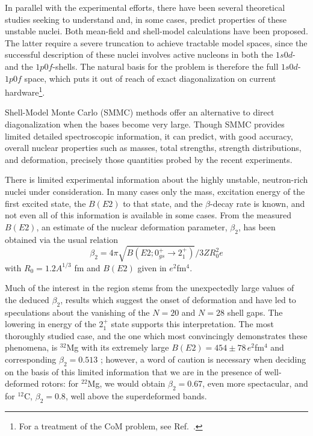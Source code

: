 \documentclass{article}
\begin{document}
In parallel with the experimental efforts, there have been several
theoretical studies seeking to understand and, in some cases, predict
properties of these unstable nuclei.  Both mean-field
\cite{r:werner,r:campi} and shell-model calculations
\cite{r:brown1,r:brown2,r:wbmb,r:poves1,r:fukunishi,r:retamosa,r:caurier}
have been proposed. The latter require a severe truncation to
achieve tractable model spaces, since the successful description of these
nuclei involves active nucleons in both the $1s0d$- and the $1p0f$-shells.
The natural basis for the problem is therefore the full $1s0d$-$1p0f$
space, which puts it out of reach of exact diagonalization on current
hardware\footnote{For a treatment of the CoM problem, see Ref.\
\cite{drhklz99}.}.

Shell-Model Monte Carlo (SMMC) methods
\cite{r:smmc_pr,r:smmc_ar,r:lang} offer an alternative to direct
diagonalization when the bases become very large. Though SMMC provides
limited detailed spectroscopic information, it can predict, with good
accuracy, overall nuclear properties such as masses, total strengths,
strength distributions, and deformation, precisely those quantities
probed by the recent experiments.


There is limited experimental information about the highly unstable,
neutron-rich nuclei under consideration.  In many cases only the mass,
excitation energy of the first excited state, the $B(E2)$ to that state,
and the $\beta$-decay rate is known, and not even all of this
information is available in some cases.  From the
measured $B(E2)$, an estimate of the nuclear deformation parameter,
$\beta_2$, has been obtained via the usual relation
\begin{equation}
\beta_2 = 4 \pi \sqrt{B(E2; 0^+_{gs} \rightarrow 2^+_1)}/3 Z R_0^2 e
\end{equation}
with $R_0 = 1.2 A^{1/3}$ fm and $B(E2)$ given in $e^2$fm$^4$.

Much of the interest in the region stems from the unexpectedly large
values of the deduced $\beta_2$, results which suggest the onset of
deformation and have led to speculations about the vanishing of the $N
= 20$ and $N = 28$ shell gaps.  The lowering in energy of the 2$^+_1$
state supports this interpretation.  The most thoroughly studied case,
and the one which most convincingly demonstrates these phenomena, is
$^{32}$Mg with its extremely large $B(E2) = 454 \pm 78 \, e^2$fm$^4$ and
corresponding $\beta_2 = 0.513$ \cite{r:motobayashi}; however, a word of
caution is necessary when deciding on the basis of this
limited information that we are in the presence of well-deformed
rotors: for $^{22}$Mg, we would obtain $\beta_2 = 0.67$, even more
spectacular, and for $^{12}$C, $\beta_2 = 0.8$, well above the
superdeformed bands.
\end{document}
